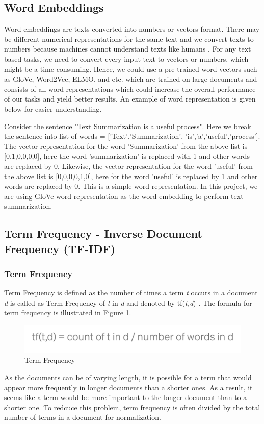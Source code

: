 \documentclass[a4paper,4pt]{article}
\begin{document}
\subsection{Word Embeddings}
Word embeddings are texts converted into numbers or vectors format. There may be different numerical representations for the 
same text and we convert texts to numbers because machines cannot understand texts like humans \cite{nss}. For any text based tasks, we 
need to convert every input text to vectors or numbers, which might be a time consuming. Hence, we could use a pre-trained 
word vectors such as GloVe, Word2Vec, ELMO, and etc. which are trained on large documents and consists of all word representations
which could increase the overall performance of our tasks and yield better results. An example of word representation is given below
for easier understanding. \\ \par
Consider the sentence "Text Summarization is a useful process". Here we break the sentence into list of words = ['Text','Summarization',
'is','a','useful','process']. The vector representation for the word 'Summarization' from the above list is [0,1,0,0,0,0], here the word 'summarization'
is replaced with 1 and other words are replaced by 0. Likewise, the vector representation for the word 'useful' from the above list is [0,0,0,0,1,0], here
for the word 'useful' is replaced by 1 and other words are replaced by 0. This is a simple word representation. In this project, we are
using GloVe word representation as the word embedding to perform text summarization.

\subsection{Term Frequency - Inverse Document Frequency (TF-IDF)}
\subsubsection{Term Frequency}
Term Frequency is defined as the number of times a term \textit{t} occurs in a document \textit{d} is called as Term Frequency of 
\textit{t} in \textit{d} and denoted by tf(\textit{t,d}) \cite{tfidf}. The formula for term frequency is illustrated in Figure \ref{fig:tf}.
\begin{figure}[h]
    \centering
    \includegraphics[scale=0.45]{images/tf.png}
    \caption{Term Frequency}
    \label{fig:tf}
\end{figure}
As the documents can be of varying length, it is possible for a term that would appear more frequently in longer documents than a 
shorter ones. As a result, it seems like a term would be more important to the longer document than to a shorter one. To redcuce this
problem, term frequency is often divided by the total number of terms in a document for normalization.
\end{document}
